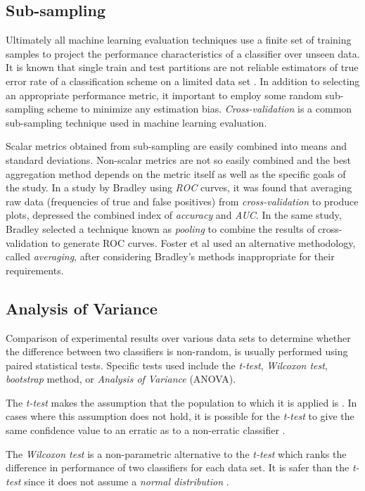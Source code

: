 \documentclass[10pt]{unbthesis}
\begin{document}
\subsection{Sub-sampling}
Ultimately all machine learning evaluation techniques use a finite set
of training samples to project the performance characteristics of a
classifier over unseen data. It is known that single train and test
partitions are not reliable estimators of true error rate of a
classification scheme on a limited data set \cite{RefWorks:57}. In
addition to selecting an appropriate performance metric, it important
to employ some random sub-sampling scheme to minimize any estimation
bias. \textit{Cross-validation} is a common sub-sampling technique
used in machine learning evaluation.

Scalar metrics obtained from sub-sampling are easily combined into
means and standard deviations. Non-scalar metrics are not so easily
combined and the best aggregation method depends on the metric itself as well as
the specific goals of the study. In a
study by Bradley \cite{RefWorks:32} using \textit{ROC} curves, it was found
that averaging raw data (frequencies of true and false positives) from
\textit{cross-validation} to produce plots,
depressed the combined index of \textit{accuracy} and \textit{AUC}. In
the same study, Bradley selected a technique known as \textit{pooling}
to combine the results of cross-validation to generate ROC
curves. Foster et al \cite{RefWorks:45} used an alternative
methodology, called \textit{averaging}, after considering Bradley's
methods inappropriate for their requirements.


\subsection{Analysis of Variance}
Comparison of experimental results over various data sets to determine
whether the difference between two classifiers is non-random, is usually
performed using paired statistical tests. Specific tests used include the
\textit{t-test}, \textit{Wilcoxon test}, \textit{bootstrap} method,
or \textit{Analysis of Variance} (ANOVA).

The \textit{t-test} makes the assumption that the population to which
it is applied is . In cases where this assumption
does not hold, it is possible for the \textit{t-test} to give the same
confidence value to an erratic as to a non-erratic classifier
\cite{RefWorks:43}. 

The \textit{Wilcoxon test} is a non-parametric alternative to the
\textit{t-test} which ranks the difference in performance of two
classifiers for each data set. It is safer than the \textit{t-test}
since it does not assume a \textit{normal distribution}
\cite{RefWorks:47}. 
\end{document}
